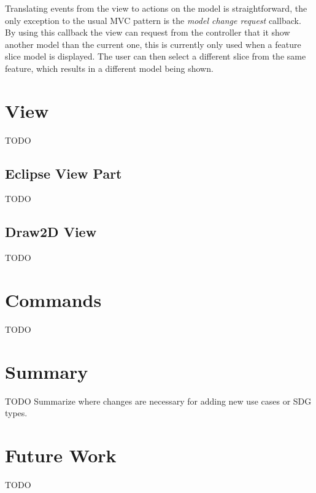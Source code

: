 Translating events from the view to actions on the model is straightforward, the only exception to the usual MVC 
pattern is the \emph{model change request} callback. By using this callback the view can request from the controller 
that it show another model than the current one, this is currently only used when a feature slice model is displayed. 
The user can then select a different slice from the same feature, which results in a different model being shown.


\section{View}

TODO

\subsection{Eclipse View Part}

TODO

\subsection{Draw2D View}

TODO


\section{Commands}

TODO


\section{Summary}

TODO Summarize where changes are necessary for adding new use cases or SDG types.


\section{Future Work}

TODO
